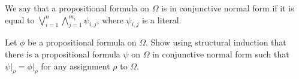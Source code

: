 \documentclass[addpoints]{exam}
\begin{document}
\begin{questions}
\begin{parts}
				We say that a propositional formula on $\Omega$ is in conjunctive normal form
				if it is equal to $\bigvee_{i = 1}^n \bigwedge_{j = 1}^{m_i} \psi_{i, j}$,
				where $\psi_{i, j}$ is a literal.
				
				Let $\phi$ be a propositional formula on $\Omega$. Show using structural induction
				that there is a propositional formula $\psi$ on $\Omega$ in conjunctive normal
				form such that $\psi\big\rvert_\rho = \phi\big\rvert_\rho$ for any
				assignment $\rho$ to $\Omega$.
            \begin{solution}[\stretch{1}]
              
            \end{solution}
      \end{parts}
      \newpage
  \end{questions}
\end{document}
